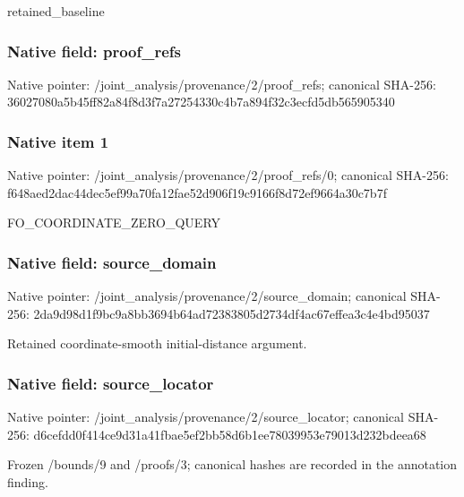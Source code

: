 \documentclass[10pt,a4paper]{article}
\begin{document}
\begingroup\raggedright\sloppy retained\_\allowbreak{}baseline\par\endgroup

\subsubsection{Native field: proof\_\allowbreak{}refs}
Native pointer: /joint\_\allowbreak{}analysis/provenance/2/proof\_\allowbreak{}refs; canonical SHA-256: 36027080a5b45ff82a84f8d3f7a27254330c4b7a894f32c3ecfd5db565905340

\subsubsection{Native item 1}
Native pointer: /joint\_\allowbreak{}analysis/provenance/2/proof\_\allowbreak{}refs/0; canonical SHA-256: f648aed2dac44dec5ef99a70fa12fae52d906f19c9166f8d72ef9664a30c7b7f

\begingroup\raggedright\sloppy FO\_\allowbreak{}COORDINATE\_\allowbreak{}ZERO\_\allowbreak{}QUERY\par\endgroup

\subsubsection{Native field: source\_\allowbreak{}domain}
Native pointer: /joint\_\allowbreak{}analysis/provenance/2/source\_\allowbreak{}domain; canonical SHA-256: 2da9d98d1f9bc9a8bb3694b64ad72383805d2734df4ac67effea3c4e4bd95037

\begingroup\raggedright\sloppy Retained coordinate-smooth initial-distance argument.\par\endgroup

\subsubsection{Native field: source\_\allowbreak{}locator}
Native pointer: /joint\_\allowbreak{}analysis/provenance/2/source\_\allowbreak{}locator; canonical SHA-256: d6cefdd0f414ce9d31a41fbae5ef2bb58d6b1ee78039953e79013d232bdeea68

\begingroup\raggedright\sloppy Frozen /\allowbreak{}bounds/\allowbreak{}9 and /\allowbreak{}proofs/\allowbreak{}3;\allowbreak{} canonical hashes are recorded in the annotation finding.\par\endgroup
\end{document}
